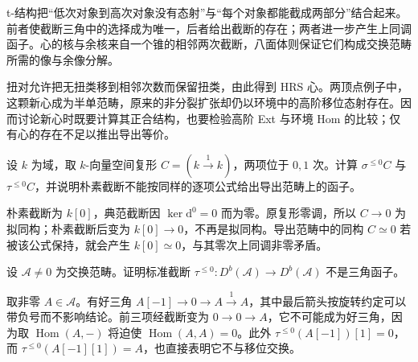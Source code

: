 






\begin{chaptersummary}
	t-结构把“低次对象到高次对象没有态射”与“每个对象都能截成两部分”结合起来。前者使截断三角中的选择成为唯一，后者给出截断的存在；两者进一步产生上同调函子。心的核与余核来自一个锥的相邻两次截断，八面体则保证它们构成交换范畴所需的像与余像分解。

	\ProseParagraphBreak
	扭对允许把无扭类移到相邻次数而保留扭类，由此得到 HRS 心。两顶点例子中，这颗新心成为半单范畴，原来的非分裂扩张却仍以环境中的高阶移位态射存在。因而讨论新心时既要计算其正合结构，也要检验高阶 Ext 与环境 Hom 的比较；仅有心的存在不足以推出导出等价。
\end{chaptersummary}

\BookExercises

\begin{exercise}\label{b4:ex:19-brutal-not-derived}
	设 \(k\) 为域，取 \(k\)-向量空间复形 \(C=(k\xrightarrow{1}k)\)，两项位于 \(0,1\) 次。计算 \(\sigma^{\le0}C\) 与 \(\tau^{\le0}C\)，并说明朴素截断不能按同样的逐项公式给出导出范畴上的函子。
\end{exercise}
\begin{solution}
	朴素截断为 \(k[0]\)，典范截断因 \(\ker \mathrm{d}^0=0\) 而为零。原复形零调，所以 \(C\to0\) 为拟同构；朴素截断后变为 \(k[0]\to0\)，不再是拟同构。导出范畴中的同构 \(C\simeq0\) 若被该公式保持，就会产生 \(k[0]\simeq0\)，与其零次上同调非零矛盾。
\end{solution}

\begin{exercise}\label{b4:ex:19-truncation-not-triangulated}
	设 \(\mathcal A\ne0\) 为交换范畴。证明标准截断 \(\tau^{\le0}:D^b(\mathcal A)\to D^b(\mathcal A)\) 不是三角函子。
\end{exercise}
\begin{solution}
	取非零 \(A\in\mathcal A\)。有好三角 \(A[-1]\to0\to A\xrightarrow{1}A\)，其中最后箭头按旋转约定可以带负号而不影响结论。前三项经截断变为 \(0\to0\to A\)，它不可能成为好三角，因为取 \(\operatorname{Hom}(A,-)\) 将迫使 \(\operatorname{Hom}(A,A)=0\)。此外 \(\tau^{\le0}(A[-1])[1]=0\)，而 \(\tau^{\le0}(A[-1][1])=A\)，也直接表明它不与移位交换。
\end{solution}

